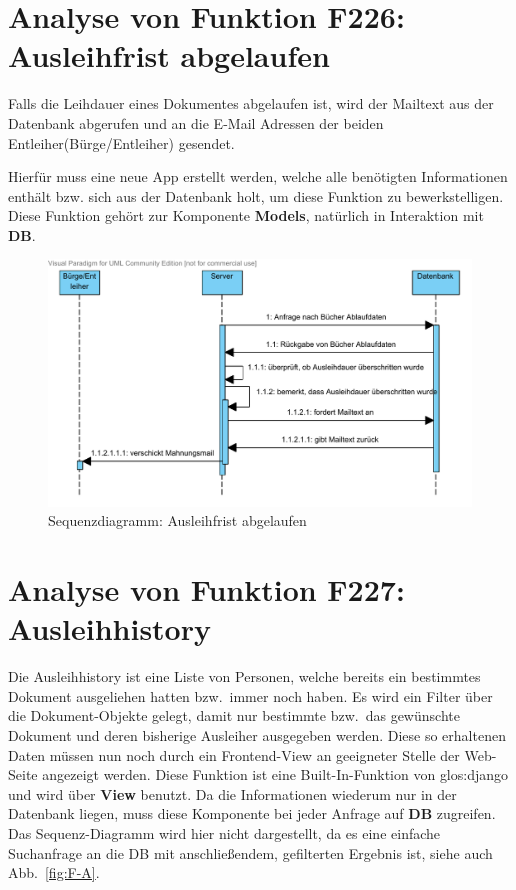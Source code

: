 \section{Analyse von Funktion F226: Ausleihfrist abgelaufen}
Falls die Leihdauer eines Dokumentes abgelaufen ist, wird der Mailtext aus der 
Datenbank abgerufen und an die E-Mail Adressen der beiden Entleiher(Bürge/Entleiher) gesendet.

Hierfür muss eine neue App erstellt werden, welche alle benötigten Informationen enthält bzw. sich aus der Datenbank holt, um diese Funktion zu bewerkstelligen.
Diese Funktion gehört zur Komponente \textbf{Models}, natürlich in Interaktion mit \textbf{DB}.
\begin{figure}
\includegraphics[width=0.8\linewidth]{bilder/SeqMail.pdf}
\caption{Sequenzdiagramm: Ausleihfrist abgelaufen}
\label{fig:226}
\end{figure}

\section{Analyse von Funktion F227: Ausleihhistory}
\label{f:227}
Die Ausleihhistory ist eine Liste von Personen, welche bereits ein bestimmtes Dokument ausgeliehen hatten bzw.\ immer noch haben.
Es wird ein Filter über die Dokument-Objekte gelegt, damit nur bestimmte bzw.\ das gewünschte Dokument und deren bisherige Ausleiher ausgegeben werden. Diese so erhaltenen Daten müssen nun noch durch ein Frontend-View an geeigneter Stelle der Web-Seite angezeigt werden.
Diese Funktion ist eine Built-In-Funktion von \gls{glos:django} und wird über \textbf{View} benutzt. Da die Informationen wiederum nur in der Datenbank liegen, muss diese Komponente bei jeder Anfrage auf \textbf{DB} zugreifen.
Das Sequenz-Diagramm wird hier nicht dargestellt, da es eine einfache Suchanfrage an die DB mit anschließendem, gefilterten Ergebnis ist, siehe auch Abb.\ \ref{fig:F-A}.

